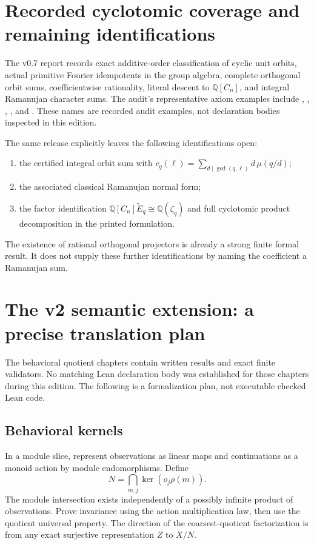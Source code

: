 \documentclass[11pt]{article}
\begin{document}
\section{Recorded cyclotomic coverage and remaining identifications}
The v0.7 report records exact additive-order classification of cyclic unit
orbits, actual primitive Fourier idempotents in the group algebra, complete
orthogonal orbit sums, coefficientwise rationality, literal descent to
\(\mathbb Q[C_n]\), and integral Ramanujan character sums. The audit's
representative axiom examples include
\texttt{},
\texttt{},
\texttt{},
\texttt{}, and
\texttt{}.
These names are recorded audit examples, not declaration bodies inspected
in this edition.

The same release explicitly leaves the following identifications open:
\begin{enumerate}
\item the certified integral orbit sum with
\(c_q(\ell)=\sum_{d\mid\gcd(q,\ell)}d\,\mu(q/d)\);
\item the associated classical Ramanujan normal form;
\item the factor identification
\(\mathbb Q[C_n]\widetilde E_q\cong\mathbb Q(\zeta_q)\) and full
cyclotomic product decomposition in the printed formulation.
\end{enumerate}
The existence of rational orthogonal projectors is already a strong finite
formal result. It does not supply these further identifications by naming
the coefficient a Ramanujan sum.

\section{The v2 semantic extension: a precise translation plan}
The behavioral quotient chapters contain written results and exact finite
validators. No matching Lean declaration body was established for those
chapters during this edition. The following is a formalization plan,
not executable checked Lean code.

\subsection{Behavioral kernels}
In a module slice, represent observations as linear maps and continuations
as a monoid action by module endomorphisms. Define
\[
 N=\bigcap_{m,j}\ker(o_j\rho(m)).
\]
The module intersection exists independently of a possibly infinite product
of observations. Prove invariance using the action multiplication law, then
use the quotient universal property. The direction of the coarsest-quotient
factorization is from any exact surjective representation \(Z\) to \(X/N\).
\end{document}
